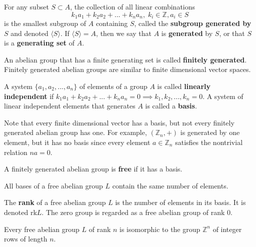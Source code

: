   \begin{definition}
    For any subset $S \subset A$, the collection of all linear combinations 
    \begin{equation}
      k_1 a_1 + k_2 a_2 + ... + k_n a_n, \; k_i \in \mathbb{Z}, a_i \in S
    \end{equation}
    is the smallest subgroup of $A$ containing $S$, called the \textbf{subgroup generated by $S$} and denoted $\langle S \rangle$. If $\langle S \rangle = A$, then we say that $A$ is \textbf{generated} by $S$, or that $S$ is a \textbf{generating set} of $A$. 
  \end{definition}

  \begin{definition}
    An abelian group that has a finite generating set is called \textbf{finitely generated}. Finitely generated abelian groups are similar to finite dimensional vector spaces. 
  \end{definition}

  \begin{definition}
    A system $\{ a_1, a_2, ..., a_n\}$ of elements of a group $A$ is called \textbf{linearly independent} if $k_1 a_1 + k_2 a_2 + ... + k_n a_n = 0 \implies k_1, k_2, ..., k_n = 0$. A system of linear independent elements that generates $A$ is called a \textbf{basis}. 
  \end{definition}

  Note that every finite dimensional vector has a basis, but not every finitely generated abelian group has one. For example, $(\mathbb{Z}_n, +)$ is generated by one element, but it has no basis since every element $a \in \mathbb{Z}_n$ satisfies the nontrivial relation $n a = 0$. 

  \begin{definition}
    A finitely generated abelian group is \textbf{free} if it has a basis. 
  \end{definition}

  \begin{theorem}
    All bases of a free abelian group $L$ contain the same number of elements. 
  \end{theorem}

  \begin{definition}
    The \textbf{rank} of a free abelian group $L$ is the number of elements in its basis. It is denoted rk$L$. The zero group is regarded as a free abelian group of rank $0$. 
  \end{definition}

  \begin{theorem}
    Every free abelian group $L$ of rank $n$ is isomorphic to the group $\mathbb{Z}^n$ of integer rows of length $n$. 
  \end{theorem}

